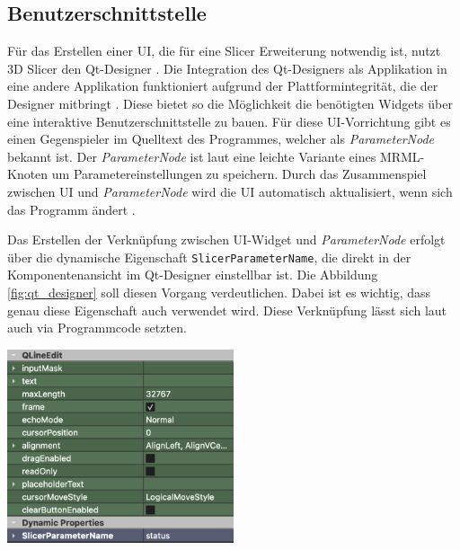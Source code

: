\subsection{Benutzerschnittstelle}
\label{subsec:benutzerschnitstelle} Für das Erstellen einer \ac{UI}, die für
eine Slicer Erweiterung notwendig ist, nutzt 3D Slicer den Qt-Designer \citep[vgl.][]{qt2024}.
Die Integration des Qt-Designers als Applikation in eine andere Applikation funktioniert
aufgrund der Plattformintegrität, die der Designer mitbringt \citep[vgl.][]{qt2024}.
Diese bietet so die Möglichkeit die benötigten Widgets über eine interaktive
Benutzerschnittstelle zu bauen. Für diese \ac{UI}-Vorrichtung gibt es einen
Gegenspieler im Quelltext des Programmes, welcher als \textit{ParameterNode}
bekannt ist. Der \textit{ParameterNode} ist laut \citet{slicer2024} eine leichte
Variante eines \ac{MRML}-Knoten um Parametereinstellungen zu speichern. Durch das
Zusammenspiel zwischen \ac{UI} und \textit{ParameterNode} wird die \ac{UI}
automatisch aktualisiert, wenn sich das Programm ändert \citep[vgl.][]{slicer2024}.

\begin{minipage}{0.35\textwidth}
	Das Erstellen der Verknüpfung zwischen \ac{UI}-Widget und \textit{ParameterNode}
	erfolgt über die dynamische Eigenschaft \texttt{SlicerParameterName}, die direkt
	in der Komponentenansicht im Qt-Designer einstellbar ist. Die Abbildung
	\ref{fig:qt_designer} soll diesen Vorgang verdeutlichen. Dabei ist es wichtig,
	dass genau diese Eigenschaft auch verwendet wird. Diese Verknüpfung lässt sich
	laut \citet{slicer2024} auch via Programmcode setzten.
\end{minipage}
\hfill
\begin{minipage}{0.55\textwidth}
	\centering
	\includegraphics[width=0.5\textwidth]{img/qt_designer.png}
	\label{fig:qt_designer}
\end{minipage}

